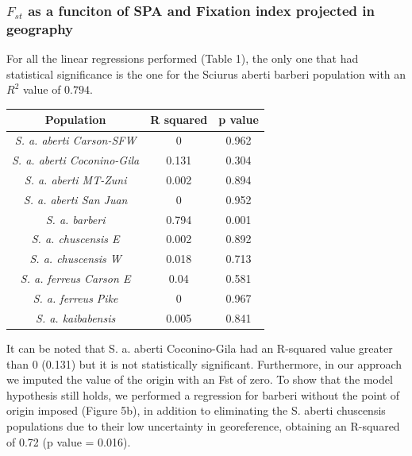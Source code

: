 \documentclass[
]{article}
\begin{document}
\hypertarget{f_st-as-a-funciton-of-spa-and-fixation-index-projected-in-geography}{%
\subsubsection{\texorpdfstring{\(F_{st}\) as a funciton of SPA and
Fixation index projected in
geography}{F\_\{st\} as a funciton of SPA and Fixation index projected in geography}}\label{f_st-as-a-funciton-of-spa-and-fixation-index-projected-in-geography}}

For all the linear regressions performed (Table 1), the only one that
had statistical significance is the one for the Sciurus aberti barberi
population with an \(R^2\) value of \(0.794\).

\begin{longtable}[]{@{}ccc@{}}
\toprule\noalign{}
Population & R squared & p value \\
\midrule\noalign{}
\endhead
\bottomrule\noalign{}
\endlastfoot
\emph{S. a. aberti Carson-SFW} & 0 & 0.962 \\
\emph{S. a. aberti Coconino-Gila} & 0.131 & 0.304 \\
\emph{S. a. aberti MT-Zuni} & 0.002 & 0.894 \\
\emph{S. a. aberti San Juan} & 0 & 0.952 \\
\emph{S. a. barberi} & 0.794 & 0.001 \\
\emph{S. a. chuscensis E} & 0.002 & 0.892 \\
\emph{S. a. chuscensis W} & 0.018 & 0.713 \\
\emph{S. a. ferreus Carson E} & 0.04 & 0.581 \\
\emph{S. a. ferreus Pike} & 0 & 0.967 \\
\emph{S. a. kaibabensis} & 0.005 & 0.841 \\
\end{longtable}

It can be noted that S. a. aberti Coconino-Gila had an R-squared value
greater than 0 (0.131) but it is not statistically significant.
Furthermore, in our approach we imputed the value of the origin with an
Fst of zero. To show that the model hypothesis still holds, we performed
a regression for barberi without the point of origin imposed (Figure
5b), in addition to eliminating the S. aberti chuscensis populations due
to their low uncertainty in georeference, obtaining an R-squared of 0.72
(p value = 0.016).
\end{document}
